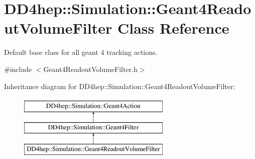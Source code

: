 \hypertarget{class_d_d4hep_1_1_simulation_1_1_geant4_readout_volume_filter}{}\section{D\+D4hep\+:\+:Simulation\+:\+:Geant4\+Readout\+Volume\+Filter Class Reference}
\label{class_d_d4hep_1_1_simulation_1_1_geant4_readout_volume_filter}


Default base class for all geant 4 tracking actions.  




{\ttfamily \#include $<$Geant4\+Readout\+Volume\+Filter.\+h$>$}

Inheritance diagram for D\+D4hep\+:\+:Simulation\+:\+:Geant4\+Readout\+Volume\+Filter\+:\begin{figure}[H]
\begin{center}
\leavevmode
\includegraphics[height=3.000000cm]{class_d_d4hep_1_1_simulation_1_1_geant4_readout_volume_filter}
\end{center}
\end{figure}
